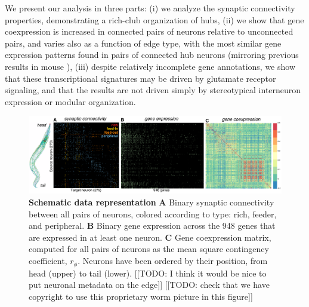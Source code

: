\documentclass[10pt,letterpaper]{article}
\begin{document}
We present our analysis in three parts:
(i) we analyze the synaptic connectivity properties, demonstrating a rich-club organization of hubs,
(ii) we show that gene coexpression is increased in connected pairs of neurons relative to unconnected pairs, and varies also as a function of edge type, with the most similar gene expression patterns found in pairs of connected hub neurons (mirroring previous results in mouse \cite{Fulcher:2016ck}),
(iii) despite relatively incomplete gene annotations, we show that these transcriptional signatures may be driven by glutamate receptor signaling, and that the results are not driven simply by stereotypical interneuron expression or modular organization.

\begin{figure}[t]
  \centering
    \includegraphics[width=1\textwidth]{schematic.pdf}
 \caption{\textbf{Schematic data representation}
 \textbf{A} Binary synaptic connectivity between all pairs of neurons, colored according to type: rich, feeder, and peripheral.
  \textbf{B} Binary gene expression across the 948 genes that are expressed in at least one neuron.
 \textbf{C} Gene coexpression matrix, computed for all pairs of neurons as the mean square contingency coefficient, $r_\phi$.
Neurons have been ordered by their position, from head (upper) to tail (lower).
[[TODO: I think it would be nice to put neuronal metadata on the edge]]
[[TODO: check that we have copyright to use this proprietary worm picture in this figure]]
}
\label{fig:SchematicRepresentation}
\end{figure}
\end{document}
